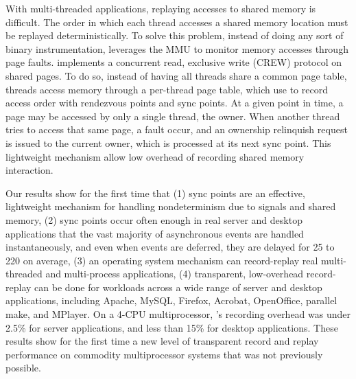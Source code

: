 With multi-threaded applications, replaying accesses to shared memory is
difficult. The order in which each thread accesses a shared memory location must
be replayed deterministically. To solve this problem, instead of doing any sort
of binary instrumentation, \scribe leverages the MMU to monitor memory accesses
through page faults. \scribe implements a concurrent read, exclusive write
(CREW) protocol on shared pages. To do so, instead of having all threads share a
common page table, threads access memory through a per-thread page table, which
\scribe use to record access order with rendezvous points and sync points.
At a given point in time, a page may be accessed by only a single thread, the
owner. When another thread tries to access that same page, a fault occur,
and an ownership relinquish request is issued to the current owner, which is
processed at its next sync point. This lightweight mechanism allow low
overhead of recording shared memory interaction.

Our results show for the first time that (1) sync points are an effective,
lightweight mechanism for handling nondeterminism due to signals and shared
memory, (2) sync points occur often enough in real server and desktop
applications that the vast majority of asynchronous events are handled
instantaneously, and even when events are deferred, they are delayed for 25 to
220\us{} on average, (3) an operating system mechanism can record-replay real
multi-threaded and multi-process applications, (4) transparent, low-overhead
record-replay can be done for workloads across a wide range of server and
desktop applications, including Apache, MySQL, Firefox, Acrobat, OpenOffice,
parallel make, and MPlayer.  On a 4-CPU multiprocessor, \scribe{}'s recording
overhead was under 2.5\% for server applications, and less than 15\% for desktop
applications.  These results show for the first time a new level of transparent
record and replay performance on commodity multiprocessor systems that was not
previously possible. 


